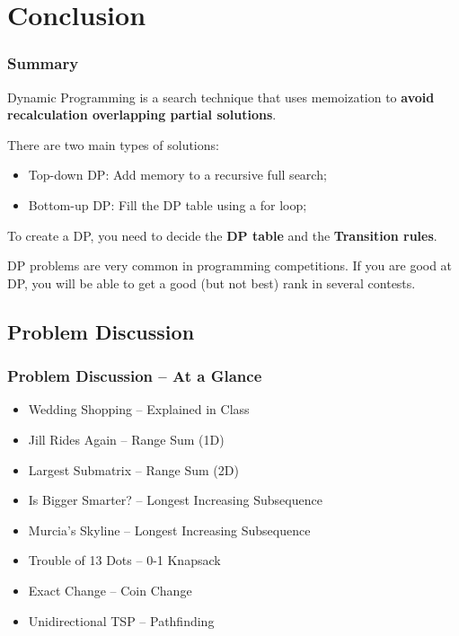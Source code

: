 \section{Conclusion}
\begin{frame}
   \frametitle{Summary}

   Dynamic Programming is a search technique that uses memoization to {\bf avoid recalculation overlapping partial solutions}.\bigskip

   There are two main types of solutions:
   \begin{itemize}
   \item \alert{Top-down DP}: Add memory to a recursive full search;
   \item \alert{Bottom-up DP}: Fill the DP table using a for loop;
   \end{itemize}
   \bigskip

   To create a DP, you need to decide the {\bf DP table} and the {\bf Transition rules}.
   \bigskip

   \begin{block}{}
     DP problems are very common in programming competitions. If you are good at DP, you will be able to get a good (but not best) rank in several contests.
   \end{block}
\end{frame}


\subsection{Problem Discussion}

\begin{frame}
   \frametitle{Problem Discussion -- At a Glance}
   \begin{itemize}
   \item Wedding Shopping -- Explained in Class
   \item Jill Rides Again -- Range Sum (1D)
   \item Largest Submatrix -- Range Sum (2D)
   \item Is Bigger Smarter? -- Longest Increasing Subsequence
   \item Murcia's Skyline -- Longest Increasing Subsequence
   \item Trouble of 13 Dots -- 0-1 Knapsack
   \item Exact Change -- Coin Change
   \item Unidirectional TSP -- Pathfinding
   \end{itemize}
\end{frame}

